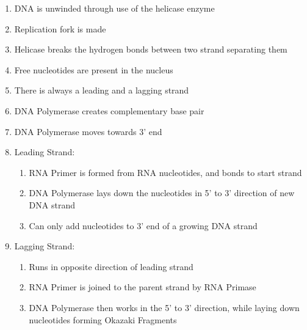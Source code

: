 \documentclass[12pt]{article}
\begin{document}
\begin{itemize}
\begin{enumerate}
        \begin{enumerate}

          \item DNA is unwinded through use of the helicase enzyme

          \item Replication fork is made

          \item Helicase breaks the hydrogen bonds between two strand separating them

          \item Free nucleotides are present in the nucleus

          \item There is always a leading and a lagging strand

          \item DNA Polymerase creates complementary base pair

          \item DNA Polymerase moves towards 3' end

          \item Leading Strand:

            \begin{enumerate}

              \item RNA Primer is formed from RNA nucleotides, and bonds to start strand

              \item DNA Polymerase lays down the nucleotides in 5' to 3' direction of new DNA strand

              \item Can only add nucleotides to 3' end of a growing DNA strand

            \end{enumerate}

          \item Lagging Strand:

            \begin{enumerate}

              \item Runs in opposite direction of leading strand

              \item RNA Primer is joined to the parent strand by RNA Primase

              \item DNA Polymerase then works in the 5' to 3' direction, while laying down nucleotides forming Okazaki Fragments


\end{enumerate}
\end{enumerate}
\end{enumerate}
\end{itemize}
\end{document}
